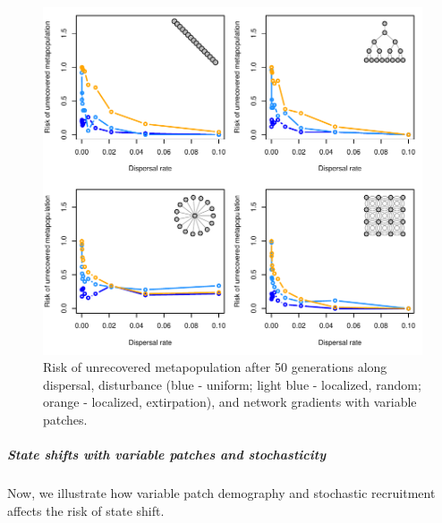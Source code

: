 \documentclass[]{article}
\let\oldsubparagraph\subparagraph
\renewcommand{\subparagraph}[1]{\oldsubparagraph{#1}\mbox{}}
\begin{document}
\begin{figure}[H]

{\centering \includegraphics{Managing_for_ecological_surprises_in_metapopulations_makeHTML_files/figure-latex/unrecovered with variable patches-1} 

}

\caption{Risk of unrecovered metapopulation after 50 generations along dispersal, disturbance (blue - uniform; light blue - localized, random; orange - localized, extirpation), and network gradients with variable patches.}\label{fig:unrecovered with variable patches}
\end{figure}

\hypertarget{state-shifts-with-variable-patches-and-stochasticity}{%
\subparagraph{State shifts with variable patches and
stochasticity}\label{state-shifts-with-variable-patches-and-stochasticity}}

Now, we illustrate how variable patch demography and stochastic
recruitment affects the risk of state shift.
\end{document}
